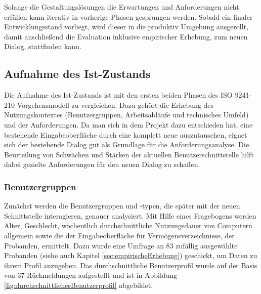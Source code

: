 Solange die Gestaltungslösungen die Erwartungen und Anforderungen nicht erfüllen kann iterativ in vorherige Phasen gesprungen werden. Sobald ein finaler Entwicklungsstand vorliegt, wird dieser in die produktiv Umgebung ausgerollt, damit anschließend die Evaluation inklusive empirischer Erhebung, zum neuen Dialog, stattfinden kann.


\subsection{Aufnahme des Ist-Zustands}
Die Aufnahme des Ist-Zustands ist mit den ersten beiden Phasen des ISO 9241-210 Vorgehensmodell zu vergleichen. Dazu gehört die Erhebung des Nutzungskontextes (Benutzergruppen, Arbeitsabläufe und technisches Umfeld) und der Anforderungen. Da man sich in dem Projekt dazu entschieden hat, eine bestehende Eingabeoberfläche durch eine komplett neue auszutauschen, eignet sich der bestehende Dialog gut als Grundlage für die Anforderungsanalyse. Die Beurteilung von Schwächen und Stärken der aktuellen Benutzerschnittstelle hilft dabei gezielte Anforderungen für den neuen Dialog zu schaffen.


\subsubsection{Benutzergruppen}
\label{sec:benutzergruppen}
Zunächst werden die Benutzergruppen und -typen, die später mit der neuen Schnittstelle interagieren, genauer analysiert. Mit Hilfe eines Fragebogens werden Alter, Geschlecht, wöchentlich durchschnittliche Nutzungsdauer von Computern allgemein sowie die der Eingabeoberfläche für Vermögensverzeichnisse, der Probanden, ermittelt. Dazu wurde eine Umfrage an 83 zufällig ausgewählte Probanden (siehe auch Kapitel \ref{sec:empirischeErhebung}) geschickt, um Daten zu ihrem Profil anzugeben. Das durchschnittliche Benutzerprofil wurde auf der Basis von 37 Rückmeldungen aufgestellt und ist in Abbildung \ref{fig:durchschnittlichesBenutzerprofil} abgebildet. 

